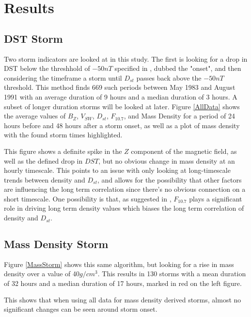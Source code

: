 \documentclass[10pt,twocolumn]{article}
\begin{document}
\section{Results}


\subsection{DST Storm}
Two storm indicators are looked at in this study. The first is looking for a drop in DST below the threshhold of $-50nT$ specified in \cite{Takahashi2010}, dubbed the "onset", and then considering the timeframe a storm until $D_{st}$ passes back above the $-50nT$ threshold. This method finds 669 such periods between May 1983 and August 1991 with an average duration of 9 hours and a median duration of 3 hours. A subset of longer duration storms will be looked at later. Figure \ref{AllData} shows the average values of $B_Z$, $V_{SW}$, $D_{st}$, $F_{10.7}$, and Mass Density for a period of 24 hours before and 48 hours after a storm onset, as well as a plot of mass density with the found storm times highlighted.



This figure shows a definite spike in the $Z$ component of the magnetic field, as well as the defined drop in $DST$, but no obvious change in mass density at an hourly timescale. This points to an issue with only looking at long-timescale trends between density and $D_{st}$, and allows for the possibility that other factors are influencing the long term correlation since there's no obvious connection on a short timescale. One possibility is that, as suggested in \cite{Takahashi2010}, $F_{10.7}$ plays a significant role in driving long term density values which biases the long term correlation of density and $D_{st}$.

\subsection{Mass Density Storm}
Figure \ref{MassStorm} shows this same algorithm, but looking for a rise in mass density over a value of 40$g/cm^3$. This results in 130 storms with a mean duration of 32 hours and a median duration of 17 hours, marked in red on the left figure.



This shows that when using all data for mass density derived storms, almost no significant changes can be seen around storm onset.
\end{document}
